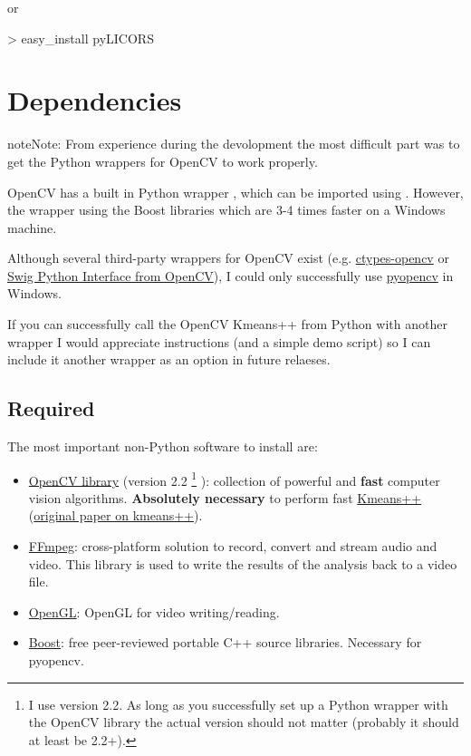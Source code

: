 \documentclass[letterpaper,10pt,english]{sphinxmanual}
\begin{document}
or

\textgreater{} easy\_install pyLICORS


\section{Dependencies}
\label{installation:dependencies}
\begin{notice}{note}{Note:}
From experience during the devolopment the most difficult
part was to get the Python wrappers for OpenCV to work properly.

OpenCV has a built in Python wrapper , which can be imported using
. However, the  wrapper using the Boost libraries which are
3-4 times faster on a Windows machine.

Although several third-party wrappers for OpenCV exist (e.g. \href{https://code.google.com/p/ctypes-opencv/}{ctypes-opencv} or \href{http://opencv.willowgarage.com/wiki/SwigPythonInterface}{Swig Python Interface from OpenCV}), I could only successfully
use \href{https://code.google.com/p/pyopencv/}{pyopencv} in Windows.

If you can successfully call the OpenCV Kmeans++ from Python with
another wrapper I would appreciate instructions (and a simple demo script) so I can
include it another wrapper as an option in future relaeses.
\end{notice}


\subsection{Required}
\label{installation:required}
The most important non-Python software to install are:
\begin{itemize}
\item {} 
\href{http://opencv.willowgarage.com/wiki/}{OpenCV library} (version 2.2 \footnote{
I use version 2.2. As long as you successfully
set up a Python wrapper with the OpenCV library
the actual version should not matter (probably it should at least be 2.2+).
} ): collection of powerful and
\textbf{fast} computer vision algorithms. \textbf{Absolutely necessary} to perform
fast \href{https://en.wikipedia.org/wiki/K-means\%2B\%2B}{Kmeans++} (\href{https://www.stanford.edu/~darthur/kMeansPlusPlus.pdf}{original paper on kmeans++}).

\item {} 
\href{http://ffmpeg.org/}{FFmpeg}: cross-platform solution to record, convert and stream audio and video.
This library is used to write the results of the analysis back to a video file.

\item {} 
\href{http://www.opengl.org/}{OpenGL}: OpenGL for video writing/reading.

\item {} 
\href{http://www.boost.org/}{Boost}: free peer-reviewed portable C++ source libraries. Necessary for pyopencv.

\end{itemize}
\end{document}
